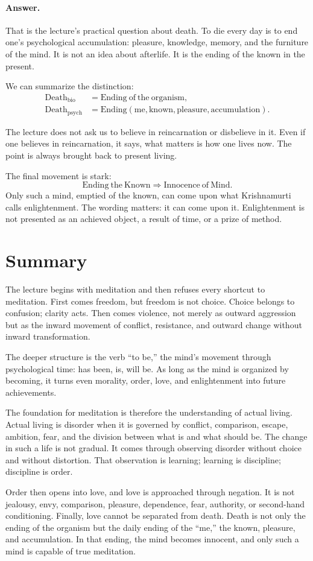\paragraph{Answer.}
That is the lecture's practical question about death. To die every day is to end one's psychological accumulation: pleasure, knowledge, memory, and the furniture of the mind. It is not an idea about afterlife. It is the ending of the known in the present.

We can summarize the distinction:
\begin{align}
\mathrm{Death}_{\mathrm{bio}} &=
\mathrm{Ending\ of\ the\ organism}, \\
\mathrm{Death}_{\mathrm{psych}} &=
\mathrm{Ending}(\mathrm{me},\mathrm{known},\mathrm{pleasure},\mathrm{accumulation}).
\end{align}

The lecture does not ask us to believe in reincarnation or disbelieve in it. Even if one believes in reincarnation, it says, what matters is how one lives now. The point is always brought back to present living.

The final movement is stark:
\begin{equation}
\mathrm{Ending\ the\ Known} \Rightarrow \mathrm{Innocence\ of\ Mind}.
\end{equation}
Only such a mind, emptied of the known, can come upon what Krishnamurti calls enlightenment. The wording matters: it can come upon it. Enlightenment is not presented as an achieved object, a result of time, or a prize of method.

\section{Summary}

The lecture begins with meditation and then refuses every shortcut to meditation. First comes freedom, but freedom is not choice. Choice belongs to confusion; clarity acts. Then comes violence, not merely as outward aggression but as the inward movement of conflict, resistance, and outward change without inward transformation.

The deeper structure is the verb ``to be,'' the mind's movement through psychological time: has been, is, will be. As long as the mind is organized by becoming, it turns even morality, order, love, and enlightenment into future achievements.

The foundation for meditation is therefore the understanding of actual living. Actual living is disorder when it is governed by conflict, comparison, escape, ambition, fear, and the division between what is and what should be. The change in such a life is not gradual. It comes through observing disorder without choice and without distortion. That observation is learning; learning is discipline; discipline is order.

Order then opens into love, and love is approached through negation. It is not jealousy, envy, comparison, pleasure, dependence, fear, authority, or second-hand conditioning. Finally, love cannot be separated from death. Death is not only the ending of the organism but the daily ending of the ``me,'' the known, pleasure, and accumulation. In that ending, the mind becomes innocent, and only such a mind is capable of true meditation.